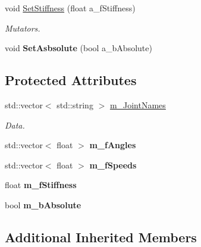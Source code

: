\begin{DoxyCompactItemize}
\mbox{\label{class_move_joint_gesture_aea6c14e63573d012c4db6d4e07590ff5}} 
void \hyperlink{class_move_joint_gesture_aea6c14e63573d012c4db6d4e07590ff5}{Set\+Stiffness} (float a\+\_\+f\+Stiffness)
\begin{DoxyCompactList}\small\item\em Mutators. \end{DoxyCompactList}\item 
\mbox{\label{class_move_joint_gesture_a5ed6a236f5c929feec0cc8588f4ff011}} 
void {\bfseries Set\+Asbsolute} (bool a\+\_\+b\+Absolute)
\end{DoxyCompactItemize}
\subsection*{Protected Attributes}
\begin{DoxyCompactItemize}
\item 
\mbox{\label{class_move_joint_gesture_a98774a1369abe2e98142ce3364234668}} 
std\+::vector$<$ std\+::string $>$ \hyperlink{class_move_joint_gesture_a98774a1369abe2e98142ce3364234668}{m\+\_\+\+Joint\+Names}
\begin{DoxyCompactList}\small\item\em Data. \end{DoxyCompactList}\item 
\mbox{\label{class_move_joint_gesture_a30e8c1563f7358a5889e197000cff070}} 
std\+::vector$<$ float $>$ {\bfseries m\+\_\+f\+Angles}
\item 
\mbox{\label{class_move_joint_gesture_a0bbc55286e0507229008d60e54b88185}} 
std\+::vector$<$ float $>$ {\bfseries m\+\_\+f\+Speeds}
\item 
\mbox{\label{class_move_joint_gesture_ab9cd0c5f441ac92734acfac0fc969449}} 
float {\bfseries m\+\_\+f\+Stiffness}
\item 
\mbox{\label{class_move_joint_gesture_a6c2cb16c48b3d0bed28fa26c6b126127}} 
bool {\bfseries m\+\_\+b\+Absolute}
\end{DoxyCompactItemize}
\subsection*{Additional Inherited Members}


